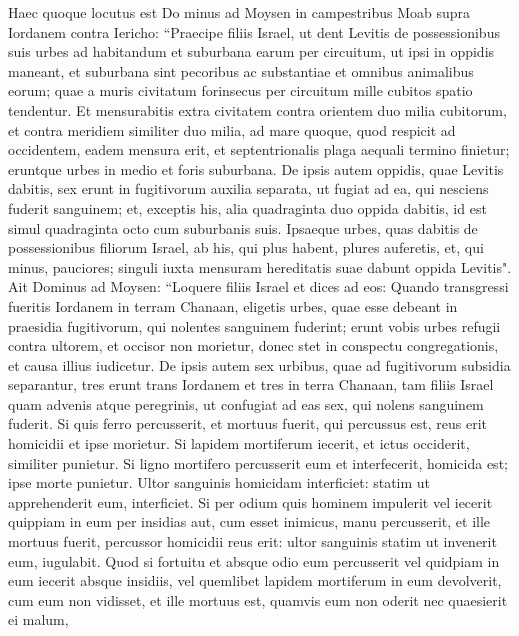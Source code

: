 \begin{biblechapter}  
\verse Haec quoque locutus est Do minus ad Moysen in campestribus Moab supra Iordanem contra Iericho: 
\verse “Praecipe filiis Israel, ut dent Levitis de possessionibus suis urbes ad habitandum et suburbana earum per circuitum, 
\verse ut ipsi in oppidis maneant, et suburbana sint pecoribus ac substantiae et omnibus animalibus eorum; 
\verse quae a muris civitatum forinsecus per circuitum mille cubitos spatio tendentur. 
\verse Et mensurabitis extra civitatem contra orientem duo milia cubitorum, et contra meridiem similiter duo milia, ad mare quoque, quod respicit ad occidentem, eadem mensura erit, et septentrionalis plaga aequali termino finietur; eruntque urbes in medio et foris suburbana. 
\verse De ipsis autem oppidis, quae Levitis dabitis, sex erunt in fugitivorum auxilia separata, ut fugiat ad ea, qui nesciens fuderit sanguinem; et, exceptis his, alia quadraginta duo oppida dabitis, 
\verse id est simul quadraginta octo cum suburbanis suis. 
\verse Ipsaeque urbes, quas dabitis de possessionibus filiorum Israel, ab his, qui plus habent, plures auferetis, et, qui minus, pauciores; singuli iuxta mensuram hereditatis suae dabunt oppida Levitis". 
\verse Ait Dominus ad Moysen: 
\verse “Loquere filiis Israel et dices ad eos: Quando transgressi fueritis Iordanem in terram Chanaan, 
\verse eligetis urbes, quae esse debeant in praesidia fugitivorum, qui nolentes sanguinem fuderint; 
\verse erunt vobis urbes refugii contra ultorem, et occisor non morietur, donec stet in conspectu congregationis, et causa illius iudicetur. 
\verse De ipsis autem sex urbibus, quae ad fugitivorum subsidia separantur, 
\verse tres erunt trans Iordanem et tres in terra Chanaan, 
\verse tam filiis Israel quam advenis atque peregrinis, ut confugiat ad eas sex, qui nolens sanguinem fuderit. 
\verse Si quis ferro percusserit, et mortuus fuerit, qui percussus est, reus erit homicidii et ipse morietur. 
\verse Si lapidem mortiferum iecerit, et ictus occiderit, similiter punietur. 
\verse Si ligno mortifero percusserit eum et interfecerit, homicida est; ipse morte punietur. 
\verse Ultor sanguinis homicidam interficiet: statim ut apprehenderit eum, interficiet. 
\verse Si per odium quis hominem impulerit vel iecerit quippiam in eum per insidias 
\verse aut, cum esset inimicus, manu percusserit, et ille mortuus fuerit, percussor homicidii reus erit: ultor sanguinis statim ut invenerit eum, iugulabit. 
\verse Quod si fortuitu et absque odio eum percusserit vel quidpiam in eum iecerit absque insidiis, 
\verse vel quemlibet lapidem mortiferum in eum devolverit, cum eum non vidisset, et ille mortuus est, quamvis eum non oderit nec quaesierit ei malum, 

\end{biblechapter}
